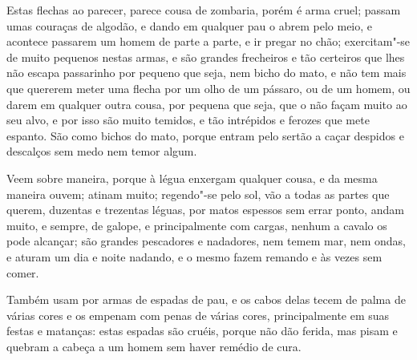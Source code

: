 \begin{linenumbers}
 Estas flechas ao parecer, parece cousa de zombaria, porém é arma cruel;
passam umas couraças de algodão, e dando em qualquer pau o abrem pelo
meio, e acontece passarem um homem de parte a parte, e ir pregar no
chão; exercitam"-se de muito pequenos nestas armas, e são grandes
frecheiros e tão certeiros que lhes não escapa passarinho por pequeno
que seja, nem bicho do mato, e não tem mais que quererem meter uma
flecha por um olho de um pássaro, ou de um homem, ou darem em qualquer
outra cousa, por pequena que seja, que o não façam muito ao seu alvo, e
por isso são muito temidos, e tão intrépidos e ferozes que mete
espanto. São como bichos do mato, porque entram pelo sertão a caçar
despidos e descalços sem medo nem temor algum.

 Veem sobre maneira, porque à légua enxergam qualquer cousa, e da mesma
maneira ouvem; atinam muito; regendo"-se pelo sol, vão a todas as partes
que querem, duzentas e trezentas léguas, por matos espessos sem errar
ponto, andam muito, e sempre, de galope, e principalmente com cargas,
nenhum a cavalo os pode alcançar; são grandes pescadores e nadadores,
nem temem mar, nem ondas, e aturam um dia e noite nadando, e o mesmo
fazem remando e às vezes sem comer.

 Também usam por armas de espadas de pau, e os cabos delas tecem de
palma de várias cores e os empenam com penas de várias cores,
principalmente em suas festas e matanças: estas espadas são cruéis,
porque não dão ferida, mas pisam e quebram a cabeça a um homem sem
haver remédio de cura.


\end{linenumbers}
